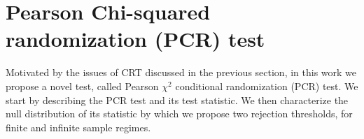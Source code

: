 \documentclass[11pt]{article}
\begin{document}














\section{Pearson Chi-squared randomization (PCR) test}\label{sec:PCR}
Motivated by the issues of CRT discussed in the previous section, in this work we propose a novel test, called Pearson $\chi^2$ conditional   randomization (PCR) test.
We start by describing the PCR test and its test statistic. We then characterize the null distribution of its statistic by which we propose two rejection thresholds, for finite and infinite sample regimes.
 
\end{document}
